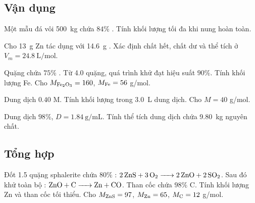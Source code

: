 \subsection{Vận dụng}
\begin{tuluyen}
Một mẫu đá vôi \SI{500}{\kilo\gram} chứa \(84\%\) . Tính khối lượng  tối đa khi nung hoàn toàn.
\end{tuluyen}

\begin{tuluyen}
Cho \SI{13}{\gram} Zn tác dụng với \SI{14.6}{\gram} . Xác định chất hết, chất dư và thể tích  ở \(V_m=\SI{24.8}{\liter\per\mole}\).
\end{tuluyen}

\begin{tuluyen}
Quặng chứa \(75\%\) . Từ \SI{4.0}{\ton} quặng, quá trình khử đạt hiệu suất \(90\%\). Tính khối lượng Fe. Cho \(M_{\ce{Fe2O3}}=160\), \(M_{\ce{Fe}}=56\) g/mol.
\end{tuluyen}

\begin{tuluyen}
Dung dịch  \(0.40\) M. Tính khối lượng  trong \SI{3.0}{\liter} dung dịch. Cho \(M=40\) g/mol.
\end{tuluyen}

\begin{tuluyen}
Dung dịch  \(98\%\), \(D=\SI{1.84}{\gram\per\milli\liter}\). Tính thể tích dung dịch chứa \SI{9.80}{\kilo\gram}  nguyên chất.
\end{tuluyen}

\subsection{Tổng hợp}
\begin{tuluyen}
Đốt \SI{1.5}{\ton} quặng sphalerite chứa \(80\%\) : \(\ce{2ZnS + 3O2 -> 2ZnO + 2SO2}\). Sau đó khử toàn bộ : \(\ce{ZnO + C -> Zn + CO}\). Than cốc chứa \(98\%\) C. Tính khối lượng Zn và than cốc tối thiểu. Cho \(M_{\ce{ZnS}}=97\), \(M_{\ce{Zn}}=65\), \(M_{\ce{C}}=12\) g/mol.
\end{tuluyen}



